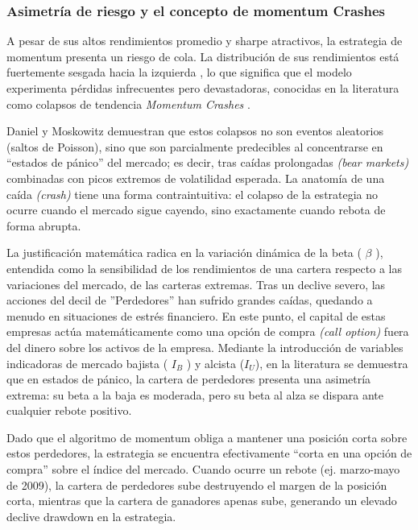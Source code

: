 \documentclass[
]{article}
\begin{document}
	\subsubsection{Asimetría de riesgo y el concepto de \gls{momentum}
		Crashes}\label{asimetruxeda-de-riesgo-y-el-concepto-de-momentum-crashes}
	
	A pesar de sus altos rendimientos promedio y \gls{sharpe}
	atractivos, la estrategia de \gls{momentum} presenta un riesgo de cola. La
	distribución de sus rendimientos está fuertemente sesgada hacia la
	izquierda \parencite{BARROSO2015111}, lo que significa que el modelo experimenta pérdidas
	infrecuentes pero devastadoras, conocidas en la literatura como colapsos de tendencia \emph{Momentum
	Crashes} \parencite{daniel2016}.
	
	Daniel y Moskowitz demuestran que estos colapsos no son
	eventos aleatorios (saltos de Poisson), sino que son parcialmente
	predecibles al concentrarse en ``estados de pánico'' del mercado; es
	decir, tras caídas prolongadas \emph{(bear markets)} combinadas con picos
	extremos de volatilidad esperada. La anatomía de una caída \emph{(crash)} tiene una
	forma contraintuitiva: el colapso de la estrategia no ocurre cuando el
	mercado sigue cayendo, sino exactamente cuando rebota de forma abrupta.
	
	La justificación matemática radica en la variación dinámica de la beta (
	\(\beta\) ), entendida como la sensibilidad de los rendimientos de una cartera respecto a las variaciones del mercado,
	 de las carteras extremas. Tras un declive severo, las
	acciones del decil de ''Perdedores'' han sufrido grandes caídas, quedando
	a menudo en situaciones de estrés financiero. En este punto, el capital
	de estas empresas actúa matemáticamente como una opción de
	compra \emph{(call option)} fuera del dinero sobre los activos de la empresa. Mediante la
	introducción de variables indicadoras de mercado bajista ( \(I_{B}\) ) y
	alcista (\(I_{U}\)), en la literatura \parencite{grundy2001} se demuestra que
	en estados de pánico, la cartera de perdedores presenta una asimetría
	extrema: su beta a la baja es moderada, pero su beta al alza se dispara
	ante cualquier rebote positivo.
	
	Dado que el algoritmo de \gls{momentum} obliga a mantener una posición corta
	sobre estos perdedores, la estrategia se encuentra efectivamente ``corta
	en una opción de compra'' sobre el índice del mercado. Cuando ocurre un
	rebote (ej. marzo-mayo de 2009), la cartera de perdedores sube
	destruyendo el margen de la posición corta, mientras que la cartera de
	ganadores apenas sube, generando un elevado declive \gls{drawdown} en la estrategia.
	
\end{document}
